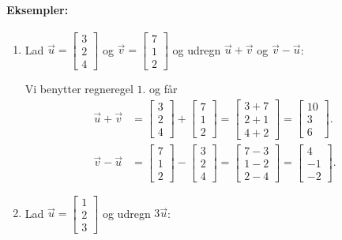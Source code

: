 \paragraph*{Eksempler:}
\begin{enumerate}
\item Lad $\vec{u}= \begin{bmatrix} 3 \\ 2 \\ 4 \end{bmatrix}$ og $\vec{v}= \begin{bmatrix} 7 \\ 1 \\ 2 \end{bmatrix}$ og udregn $\vec{u}+\vec{v}$ og $\vec{v}-\vec{u}$:

Vi benytter regneregel $1$. og får
\begin{align*}
\vec{u} + \vec{v}&= \begin{bmatrix} 3 \\ 2 \\ 4 \end{bmatrix} + \begin{bmatrix} 7 \\ 1 \\ 2 \end{bmatrix} = \begin{bmatrix} 3+7 \\ 2+1 \\ 4 + 2 \end{bmatrix}  = \begin{bmatrix} 10 \\ 3 \\ 6 \end{bmatrix}. \\
\vec{v} - \vec{u}&= \begin{bmatrix} 7 \\ 1 \\ 2 \end{bmatrix} - \begin{bmatrix} 3 \\ 2 \\ 4 \end{bmatrix} = \begin{bmatrix} 7-3 \\ 1-2 \\ 2 - 4 \end{bmatrix}  = \begin{bmatrix} 4 \\ -1 \\ -2 \end{bmatrix}.
\end{align*}
\item Lad $\vec{u}= \begin{bmatrix} 1 \\ 2 \\ 3 \end{bmatrix}$ og udregn $3\vec{u}$:


\end{enumerate}
